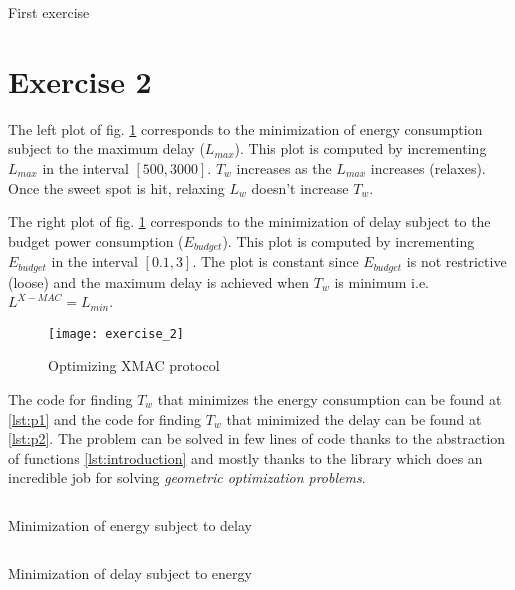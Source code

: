 \documentclass[12pt, a4paper]{article}
\begin{document}
\begin{listing}[H]
  \inputminted[firstline=57, lastline=96, breaklines=true,fontsize=\footnotesize]{python}{../code/main.py}
  \caption{First exercise}
  \label{lst:exercise1}
\end{listing}

\section*{Exercise 2}%
\label{sec:exercise2}

The left plot of fig. \ref{fig:exercise2} corresponds to the minimization of energy consumption subject to the maximum delay ($L_{max}$). This plot is computed by incrementing $L_{max}$ in the interval $[500, 3000]$. $T_{w}$ increases as the $L_{max}$ increases (relaxes). Once the sweet spot is hit, relaxing $L_{w}$ doesn't increase $T_{w}$.

The right plot of fig. \ref{fig:exercise2} corresponds to the minimization of delay subject to the budget power consumption ($E_{budget}$). This plot is computed by incrementing $E_{budget}$ in the interval $[0.1, 3]$. The plot is constant since $E_{budget}$ is not restrictive (loose) and the maximum delay is achieved when $T_{w}$ is minimum i.e. $L^{X-MAC} = L_{min}$.

\begin{figure}[H]
  \centering
  \texttt{[image: exercise\_2]}
  \caption{Optimizing XMAC protocol}
  \label{fig:exercise2}
\end{figure}

The code for finding $T_{w}$ that minimizes the energy consumption can be found at \ref{lst:p1} and the code for finding $T_{w}$ that minimized the delay can be found at \ref{lst:p2}. The problem can be solved in few lines of code thanks to the abstraction of functions \ref{lst:introduction} and mostly thanks to the  library which does an incredible job for solving \textit{geometric optimization problems}.

\begin{listing}[H]
  \inputminted[firstline=106, lastline=129, breaklines=true,fontsize=\footnotesize]{python}{../code/main.py}
  \caption{Minimization of energy subject to delay}
  \label{lst:p1}
\end{listing}

\begin{listing}[H]
  \inputminted[firstline=131, lastline=156, breaklines=true,fontsize=\footnotesize]{python}{../code/main.py}
  \caption{Minimization of delay subject to energy}
  \label{lst:p2}
\end{listing}
\end{document}
